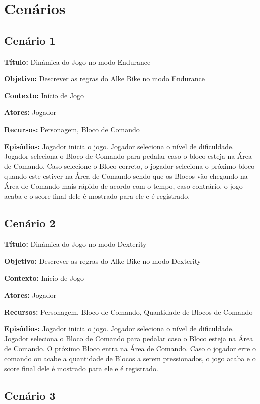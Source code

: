 \section{Cenários}
\subsection{Cenário 1}

\textbf{Título:} Dinâmica do Jogo no modo Endurance

\textbf{Objetivo:} Descrever as regras do Alke Bike no modo Endurance

\textbf{Contexto:} Início de Jogo

\textbf{Atores:} Jogador

\textbf{Recursos:} Personagem, Bloco de Comando

\textbf{Episódios:} Jogador inicia o jogo. Jogador seleciona o nível de dificuldade. Jogador seleciona o Bloco de Comando para pedalar caso o bloco esteja na Área de Comando. Caso selecione o Bloco correto, o jogador seleciona o próximo bloco quando este estiver na Área de Comando sendo que os Blocos vão chegando na Área de Comando mais rápido de acordo com o tempo, caso contrário, o jogo acaba e o score final dele é mostrado para ele e é registrado.

\subsection{Cenário 2}

\textbf{Título:} Dinâmica do Jogo no modo Dexterity

\textbf{Objetivo:} Descrever as regras do Alke Bike no modo Dexterity

\textbf{Contexto:} Início de Jogo

\textbf{Atores:} Jogador

\textbf{Recursos:} Personagem, Bloco de Comando, Quantidade de Blocos de Comando

\textbf{Episódios:} Jogador inicia o jogo. Jogador seleciona o nível de dificuldade. Jogador seleciona o Bloco de Comando para pedalar caso o Bloco esteja na Área de Comando. O próximo Bloco entra na Área de Comando. Caso o jogador erre o comando ou acabe a quantidade de Blocos a serem pressionados, o jogo acaba e o score final dele é mostrado para ele e é registrado.

\subsection{Cenário 3}


